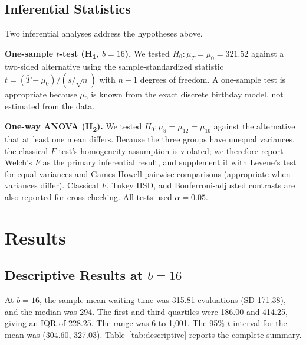 \documentclass[12pt,letterpaper]{article}
\begin{document}
\subsection{Inferential Statistics}
Two inferential analyses address the hypotheses above.

\textbf{One-sample \(t\)-test (H\textsubscript{1}, $b=16$).} We tested $H_0: \mu_T = \mu_0 = 321.52$ against a two-sided alternative using the sample-standardized statistic $t = (\bar{T} - \mu_0)/(s/\sqrt{n})$ with $n-1$ degrees of freedom. A one-sample test is appropriate because $\mu_0$ is known from the exact discrete birthday model, not estimated from the data.

\textbf{One-way ANOVA (H\textsubscript{2}).} We tested $H_0: \mu_8 = \mu_{12} = \mu_{16}$ against the alternative that at least one mean differs. Because the three groups have unequal variances, the classical $F$-test's homogeneity assumption is violated; we therefore report Welch's $F$ as the primary inferential result, and supplement it with Levene's test for equal variances and Games-Howell pairwise comparisons (appropriate when variances differ). Classical $F$, Tukey HSD, and Bonferroni-adjusted contrasts are also reported for cross-checking. All tests used $\alpha = 0.05$.

\section{Results}

\subsection{Descriptive Results at $b=16$}

At $b=16$, the sample mean waiting time was 315.81 evaluations (SD 171.38), and the median was 294. The first and third quartiles were 186.00 and 414.25, giving an IQR of 228.25. The range was 6 to 1{,}001. The 95\% $t$-interval for the mean was (304.60, 327.03). Table~\ref{tab:descriptive} reports the complete summary.
\end{document}
